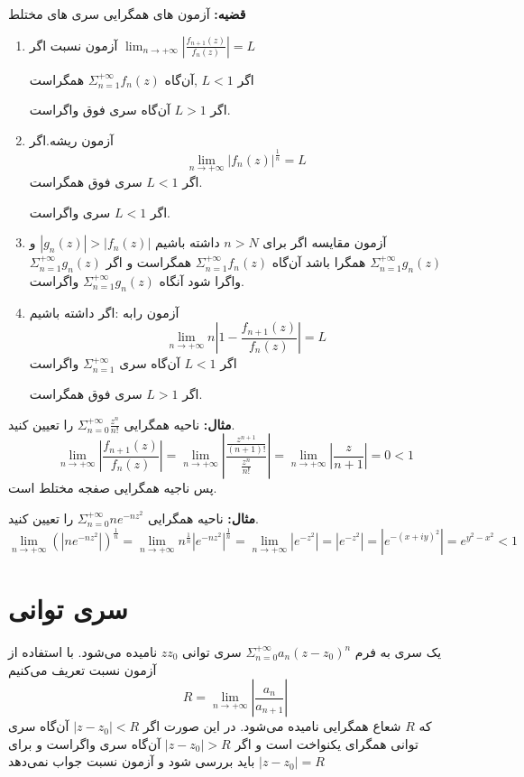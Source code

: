 \documentclass[12pt]{report}
\begin{document}
	\textbf{قضیه:}
	آزمون های همگرایی سری های مختلط
	\begin{enumerate}
		\item 
		آزمون نسبت اگر 
		$\lim_{n \to +\infty} |\frac{f_{n +1} (z)}{f_n(z)}| = L$
		
		اگر 
		$L < 1$
		,آن‌گاه
		$\Sigma_{n = 1}^{+\infty} f_n(z)$
		همگراست
		
		اگر 
		$L>1$
		آن‌گاه سری فوق واگراست.
		\item
		آزمون ریشه.اگر
		$$\lim_{n \to +\infty} |f_n(z)|^{\frac{1}{n}}= L$$
		اگر
		$L<1$
		سری فوق همگراست.
		
		اگر
		$L < 1$
		سری واگراست.
		\item
		آزمون مقایسه اگر برای 
		$n > N$
		داشته باشیم
		$|g_n(z)| > |f_n(z)|$
		و
		$\Sigma_{n = 1}^{+\infty} g_n(z)$
		همگرا باشد آن‌گاه
		$\Sigma_{n = 1}^{+\infty} f_n(z)$
		همگراست و اگر
		$\Sigma_{n = 1}^{+\infty} g_n(z)$
		واگرا شود آنگاه
		$\Sigma_{n = 1}^{+\infty} g_n(z)$
		واگراست.
		\item
		آزمون رابه :‌اگر داشته باشیم 
		$$\lim_{n \to +\infty} n |1  - \frac{f_{n +1} (z)}{f_n(z)}| = L$$
		اگر
		$L<1$
		آن‌گاه سری
		$\Sigma_{n = 1}^{+\infty}$
		واگراست
	
		اگر 
		$L > 1$
		سری فوق همگراست.

	\end{enumerate}
	

\textbf{مثال:}
ناحیه همگرایی
$\Sigma_{n = 0}^{+\infty} \frac{z^n}{n!}$
را تعیین کنید.
$$\lim_{n \to +\infty} |\frac{f_{n +1} (z)}{f_n(z)}| = \lim_{n \to +\infty} |\frac{\frac{z^{n +1}}{(n+ 1)!}}{\frac{z^n}{n!}}| = \lim_{n \to +\infty} |\frac{z}{n+1}| = 0 < 1$$ 
پس ناجیه همگرایی صفجه مختلط است.
\newline

\textbf{مثال:}
ناحیه همگرایی
$\Sigma_{n = 0}^{+\infty} ne^{-nz^2}$
را تعیین کنید.
$$\lim_{n \to +\infty} (|ne^{-nz^2}|)^{\frac{1}{n}} = \lim_{n \to +\infty} n^{\frac{1}{n}}|e^{-nz^2}|^{\frac{1}{n}} = \lim_{n \to +\infty} |e^{-z^2}| = |e^{-z^2}| = |e^{-(x + iy)^2}| = e^{y^2 - x^2} < 1$$




\section{سری توانی}
یک سری به فرم 
$\Sigma_{n = 0}^{+\infty} a_n(z - z_0)^n$
سری توانی
$zz_0$
نامیده می‌شود.
با استفاده از آزمون نسبت تعریف می‌کنیم
$$R = \lim_{n \to +\infty} |\frac{a_n}{a_{n+1}}|$$
که 
$R$
شعاع همگرایی نامیده می‌شود.
در این صورت اگر
$|z - z_0|<R$
آن‌گاه سری توانی همگرای یکنواخت است و اگر 
$|z - z_0|>R$
آن‌گاه سری واگراست و برای
$|z - z_0| = R$
باید بررسی شود و آزمون نسبت جواب نمی‌دهد
\end{document}
